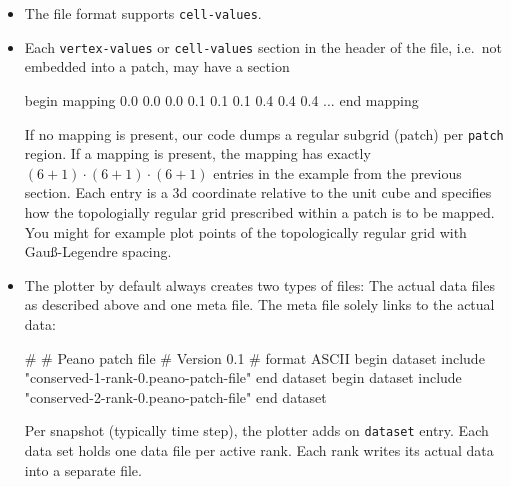 \begin{itemize}
  \item The file format supports \texttt{cell-values}.
  \item Each \texttt{vertex-values} or \texttt{cell-values} section in the
  header of the file, i.e.~not embedded into a patch, may have a section
  \begin{code}
   begin mapping
     0.0 0.0 0.0
     0.1 0.1 0.1
     0.4 0.4 0.4
     ...
   end mapping
  \end{code} 
  If no mapping is present, our code dumps a regular subgrid (patch) per
  \texttt{patch} region. If a mapping is present, the mapping has exactly $(6+1)
  \cdot (6+1) \cdot (6+1)$ entries in the example from the previous section.
  Each entry is a 3d coordinate relative to the unit cube and specifies how the
  topologially regular grid prescribed within a patch is to be mapped. You might
  for example plot points of the topologically regular grid with 
  Gau\ss -Legendre spacing.
  \item The plotter by default always creates two types of files: The actual
  data files as described above and one meta file. The meta file solely links to
  the actual data:
  \begin{code}
# 
# Peano patch file 
# Version 0.1 
# 
format ASCII
begin dataset
  include "conserved-1-rank-0.peano-patch-file"
end dataset
begin dataset
  include "conserved-2-rank-0.peano-patch-file"
end dataset
  \end{code}
  Per snapshot (typically time step), the plotter adds on \texttt{dataset}
  entry. Each data set holds one data file per active rank. Each rank writes its
  actual data into a separate file. 
\end{itemize}

